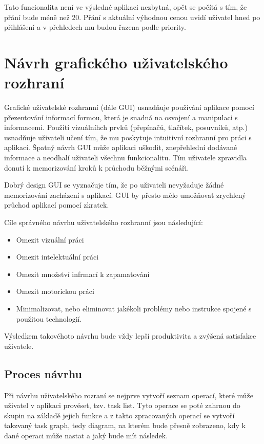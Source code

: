 Tato funcionalita není ve výsledné aplikaci nezbytná, opět se počítá s tím, že přání bude méně než 20. Přání s aktuální výhodnou cenou uvidí uživatel hned po přihlášení a v přehledech mu budou řazena podle priority.

\section{Návrh grafického uživatelského rozhraní}
Grafické uživatelské rozhranní (dále GUI) usnadňuje používání aplikace pomocí přezentování informací formou, která je snadná na osvojení a manipulaci s informacemi. Použití vizuálníhch prvků (přepínačů, tlačítek, posuvníků, atp.) usnadňuje uživateli učení tím, že mu poskytuje intuitivní rozhranní pro práci s aplikací. Špatný návrh GUI může aplikaci uškodit, znepřehlední dodávané informace a neodhalí uživateli všechnu funkcionalitu. Tím uživatele zpravidla donutí k memorizování kroků k průchodu běžnými scénáři\cite{toby2001expgui}.

Dobrý design GUI se vyznačuje tím, že po uživateli nevyžaduje žádné memorizování zacházení s aplikací. GUI by přesto mělo umožňovat zrychlený průchod aplikací pomocí zkratek\cite{toby2001expgui}.

Cíle správného návrhu uživatelského rozhranní jsou následující\cite{galitz2007essential}:
\begin{itemize}
\item Omezit vizuální práci
\item Omezit intelektuální práci
\item Omezit množství infrmací k zapamatování
\item Omezit motorickou práci
\item Minimalizovat, nebo eliminovat jakékoli problémy nebo instrukce spojené s použitou technologií.
\end{itemize}
Výsledkem takovéhoto návrhu bude vždy lepší produktivita a zvýšená satisfakce uživatele\cite{galitz2007essential}.

\subsection{Proces návrhu}
Při návrhu uživatelského rozraní se nejprve vytvoří seznam operací, které může uživatel v aplikaci provéset, tzv. task list. Tyto operace se poté zahrnou do skupin na základě jejich funkce a z takto zpracovaných operací se vytvoří takzvaný task graph, tedy diagram, na kterém bude přesně zobrazeno, kdy k dané operaci může nastat a jaký bude mít následek.

